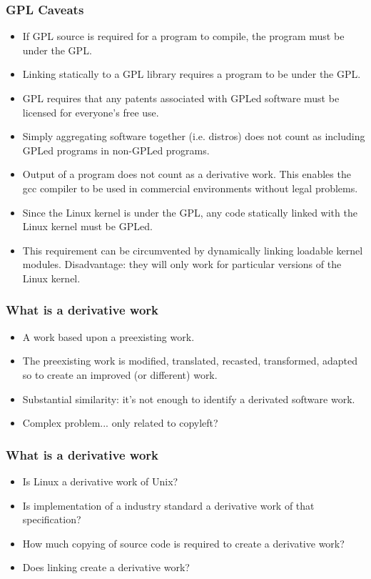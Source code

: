 \begin{frame}
\frametitle{GPL Caveats}

\begin{itemize}
\item If GPL source is required for a program to compile, the program must be under the GPL. 
\item Linking statically to a GPL library requires a program to be under the GPL.
\item GPL requires that any patents associated with GPLed software must be licensed for everyone's free use.
\item Simply aggregating software together (i.e. distros) does not count as including GPLed programs in non-GPLed programs.
\item Output of a program does not count as a derivative work. This enables the gcc compiler to be used in commercial environments without legal problems.
\item Since the Linux kernel is under the GPL, any code statically linked with the Linux kernel must be GPLed. 
\item This requirement can be circumvented by dynamically linking loadable kernel modules. Disadvantage: they will only work for particular versions of the Linux kernel.
\end{itemize}

\end{frame}


\begin{frame}
\frametitle{What is a derivative work}

\begin{itemize}
\item A work based upon a preexisting work.
\item The preexisting work is modified, translated, recasted, 
transformed, adapted so to create an improved (or different) work.
\item \alert{Substantial similarity}: it's not enough to identify a derivated software work. 
\item Complex problem... only related to copyleft?
\end{itemize}
\end{frame}


\begin{frame}
\frametitle{What is a derivative work}

\begin{itemize}
\item  Is Linux a derivative work of Unix?
\item Is implementation of a industry standard a derivative work of that specification?
\item How much copying of source code is required to create a derivative work?
\item Does linking create a derivative work?
\end{itemize}
\end{frame}


